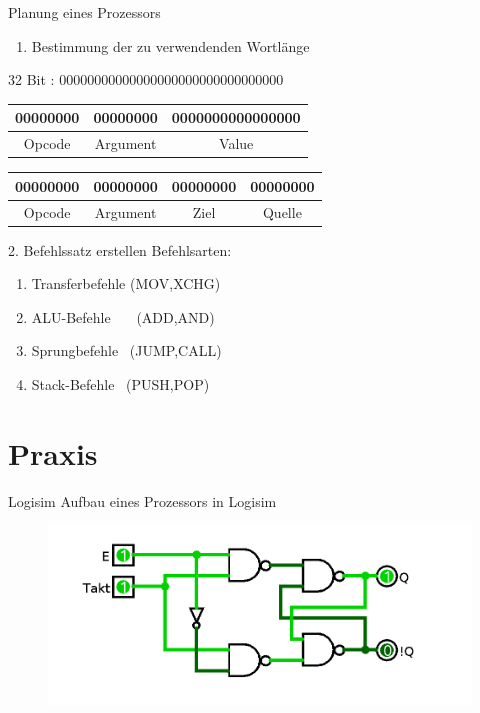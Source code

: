 \documentclass{beamer}
\begin{document}
\begin{frame}[t]{Planung eines Prozessors}
\begin{enumerate}
\item{Bestimmung der zu verwendenden Wortl\"ange}
\end{enumerate}
32 Bit : 00000000000000000000000000000000
\centering 
\pause
\begin{table}[]
\centering
\begin{tabular}{|c|c|c|}
\hline
00000000 & 00000000 & 0000000000000000 \\ \hline
Opcode   & Argument & Value            \\ \hline
\end{tabular}
\end{table}
\smallskip
\pause
\centering
\begin{table}[]
\centering
\begin{tabular}{|c|c|c|c|}
\hline
00000000 & 00000000 & 00000000 & 00000000 \\ \hline
Opcode   & Argument & Ziel     & Quelle   \\ \hline
\end{tabular}
\end{table}
\end{frame}

\begin{frame}[t]{2. Befehlssatz erstellen}\pause
Befehlsarten:
\bigskip
\center
\begin{enumerate}
\item{Transferbefehle  (MOV,XCHG)}
\item{ALU-Befehle \ \ \ (ADD,AND)}
\item{Sprungbefehle  \  (JUMP,CALL)}
\item{Stack-Befehle \ (PUSH,POP)}
\end{enumerate}
\end{frame}

\section{Praxis}
\begin{frame}{Logisim}
Aufbau eines Prozessors in Logisim
\begin{figure}[!htb]
\centering
\includegraphics[scale=0.30]{flipflop}
\end{figure}
\end{frame}
\end{document}
